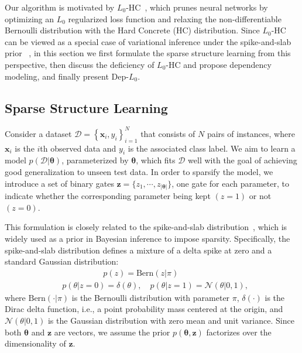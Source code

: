 \documentclass[runningheads, envcountsame, a4paper]{llncs}
\def\bs{\boldsymbol}
\begin{document}
Our algorithm is motivated by $L_0$-HC~\cite{louizos2017learning}, which prunes neural networks by optimizing an $L_0$ regularized loss function and relaxing the non-differentiable Bernoulli distribution with the Hard Concrete (HC) distribution. %
Since $L_0$-HC can be viewed as a special case of variational inference under the spike-and-slab prior ~\cite{louizos2017learning}, in this section we first formulate the sparse structure learning from this perspective, then discuss the deficiency of $L_0$-HC and propose dependency modeling, and finally present Dep-$L_0$.

\subsection{Sparse Structure Learning}


Consider a dataset $\mathcal{D}=\left\{\bs{x}_{i}, y_{i}\right\}_{i=1}^{N}$ that consists of $N$ pairs of instances, where $\bs{x}_i$ is the $i$th observed data and $y_i$ is the associated class label. We aim to learn a model $p(\mathcal{D}|\bs \theta)$, parameterized by $\bs{\theta}$, which fits $\mathcal{D}$ well with the goal of achieving good generalization to unseen test data. In order to sparsify the model, we introduce a set of binary gates $\bs{z}=\{z_1,\cdots,z_{|\bs{\theta}|}\}$, one gate for each parameter, to indicate whether the corresponding parameter being kept $(z=1)$ or not $(z=0)$. 


This formulation is closely related to the spike-and-slab distribution~\cite{mitchell1988bayesian}, which is widely used as a prior in Bayesian inference to impose sparsity. Specifically, the spike-and-slab distribution defines a mixture of a delta spike at zero and a standard Gaussian distribution:
\begin{align}
  &\quad\quad\quad\quad\quad p(z)=\text{Bern}(z|\pi)\nonumber\\
  &p(\theta|z=0)=\delta(\theta), \quad p(\theta|z=1)=\mathcal{N}(\theta|0, 1),
\end{align}
where $\text{Bern}(\cdot|\pi)$ is the Bernoulli distribution with parameter $\pi$, $\delta(\cdot)$ is the Dirac delta function, i.e., a point probability mass centered at the origin, and $\mathcal{N}(\theta|0, 1)$ is the Gaussian distribution with zero mean and unit variance. Since both $\bs{\theta}$ and $\bs{z}$ are vectors, we assume the prior $p(\bs{\theta},\bs{z})$ factorizes over the dimensionality of $\bs{z}$.
\end{document}
